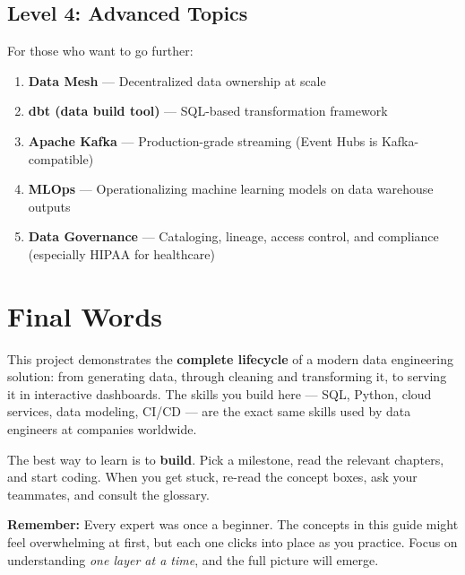 \documentclass[12pt, a4paper, oneside]{report}
\begin{document}
\subsection{Level 4: Advanced Topics}

For those who want to go further:

\begin{enumerate}[label=\textcolor{primary}{\textbf{\arabic*.}}]
    \item \textbf{Data Mesh} --- Decentralized data ownership at scale
    \item \textbf{dbt (data build tool)} --- SQL-based transformation framework
    \item \textbf{Apache Kafka} --- Production-grade streaming (Event Hubs is Kafka-compatible)
    \item \textbf{MLOps} --- Operationalizing machine learning models on data warehouse outputs
    \item \textbf{Data Governance} --- Cataloging, lineage, access control, and compliance (especially HIPAA for healthcare)
\end{enumerate}

\section{Final Words}

This project demonstrates the \textbf{complete lifecycle} of a modern data engineering solution: from generating data, through cleaning and transforming it, to serving it in interactive dashboards. The skills you build here --- SQL, Python, cloud services, data modeling, CI/CD --- are the exact same skills used by data engineers at companies worldwide.

The best way to learn is to \textbf{build}. Pick a milestone, read the relevant chapters, and start coding. When you get stuck, re-read the concept boxes, ask your teammates, and consult the glossary.

\begin{importantbox}
    \textbf{Remember:} Every expert was once a beginner. The concepts in this guide might feel overwhelming at first, but each one clicks into place as you practice. Focus on understanding \textit{one layer at a time}, and the full picture will emerge.
\end{importantbox}


\end{document}
